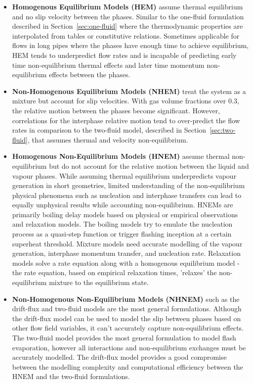  \begin{itemize}
  \item \textbf{Homogenous Equilibrium Models (HEM)} assume thermal equilibrium and no slip velocity between the phases. 
  Similar to the one-fluid formulation described in Section~\ref{sec:one-fluid} where the thermodynamic properties are interpolated from tables or constitutive relations.
  Sometimes applicable for flows in long pipes where the phases have enough time to achieve equilibrium, HEM tends to underpredict flow rates and
  is incapable of predicting early time non-equilibrium thermal effects and later time momentum non-equilibrium effects between the phases.
  \item \textbf{Non-Homogenous Equilibrium Models (NHEM)} treat the system as a mixture but account for slip velocities. With gas volume fractions over $0.3$,
  the relative motion between the phases become significant. However, correlations for the interphase relative motion tend to over-predict the 
  flow rates in comparison to the two-fluid model, described in Section~\ref{sec:two-fluid}, that assumes thermal and velocity non-equilibrium.
  \item \textbf{Homogenous Non-Equilibrium Models (HNEM)} assume thermal non-equilibrium but do not account for the relative motion between the liquid and vapour phases.
  While assuming thermal equilibrium underpredicts vapour generation in short geometries, limited understanding of the non-equilibrium physical phenomena such as nucleation 
  and interphase transfers can lead to equally unphysical results while accounting non-equilibrium. HNEMs are primarily boiling delay models based on physical or empirical 
  observations and relaxation models. The boiling models try to emulate the nucleation process as a quasi-step function or trigger flashing inception at a certain
  superheat threshold. Mixture models need accurate modelling of the vapour generation, interphase momentum transfer, and nucleation rate. Relaxation models
  solve a rate equation along with a homogenous equilibrium model - the rate equation, based on empirical relaxation times, 'relaxes' the non-equilibrium mixture to the 
  equilibrium state.
  \item \textbf{Non-Homogenous Non-Equilibrium Models (NHNEM)} such as the drift-flux and two-fluid models are the most general formulations. Although the drift-flux model can
  be used to model the slip between phases based on other flow field variables, it can't accurately capture non-equilibrium effects. The two-fluid model provides the most 
  general formulation to model flash evaporation, however all interactions and non-equilibrium exchanges must be accurately modelled. The drift-flux model provides a good compromise between
  the modelling complexity and computational efficiency between the HNEM and the two-fluid formulations.
 \end{itemize}
 \cite{dangleComputationalFluidDynamics2018,liaoComputationalModellingFlash2017,liaoReviewNumericalModelling2021}


